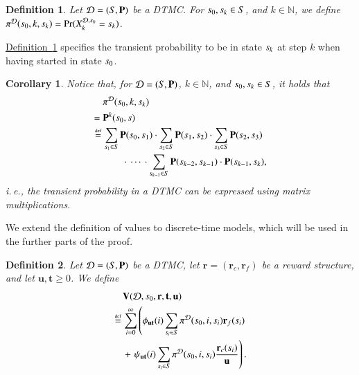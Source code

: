 \documentclass[10pt,twocolumn]{article}
\newtheorem{definition}{Definition}
\newtheorem{corollary}{Corollary}
\DeclareMathOperator{\prob}{Pr}
\newcommand{\states} {{\ensuremath S}}
\newcommand{\state}  {{\ensuremath s}}
\newcommand{\nats}    {{\ensuremath {\mathbb{N}}}}
\newcommand{\pmat}{\mathbf{P}}
\newcommand{\dmodel}{\mathcal{D}}
\newcommand{\urate}{\mathbf{u}}
\newcommand{\rew}{\mathbf{r}}
\newcommand{\frew}{\mathbf{r}_f}
\newcommand{\crew}{\mathbf{r}_c}
\newcommand{\timeb}{\mathbf{t}}
\newcommand{\mvalue}{\mathbf{V}}
\newcommand{\stopro}{X}
\newcommand{\refdef}[1]{\texorpdfstring{\hyperref[def:#1]{Definition~\ref*{def:#1}}}{Definition \ref*{def:#1}}}
\newcommand{\defeq}{\,\stackrel{\mbox{\rm {\tiny def}}}{=}\,}
\newcommand{\tprob}{\pi}
\begin{document}
\begin{definition}
  \label{def:transprobsksp}
Let $\dmodel = (\states, \pmat)$ be a DTMC.
  For $\state_0, \state_k \in \states$, and $k \in \nats$, we define $\tprob^\dmodel(\state_0, k, \state_k) = \prob(\stopro^{\dmodel,\state_0}_k = \state_k)$.
\end{definition}
\refdef{transprobsksp} specifies the transient probability to be in state $\state_k$ at step $k$ when having started in state $\state_0$.
\begin{corollary}
\label{cor:tprob-matrix}
Notice that, for $\dmodel = (\states, \pmat)$, $k \in \nats$, and $\state_0, \state_k \in \states$, it holds that
\begin{equation*}
\begin{split}
& \tprob^\dmodel(\state_0, k, \state_k) \\
= {} & \pmat^k(\state_0, \state) \\
\defeq & \sum_{\state_1 \in \states} \pmat(\state_0, \state_1) \cdot \sum_{\state_2 \in \states} \pmat(\state_1, \state_2) \cdot \sum_{\state_3 \in \states} \pmat(\state_2, \state_3) \\
& \qquad\cdot\,\dotsm\,\cdot \sum_{\state_{k-1}\in\states} \pmat(\state_{k-2}, \state_{k-1}) \cdot \pmat(\state_{k-1}, \state_k),
\end{split}
\end{equation*}
i.\,e., the transient probability in a DTMC can be expressed using matrix multiplications.
\end{corollary}

We extend the definition of values to discrete-time models, which will be used in the further parts of the proof.
\begin{definition}
\label{def:disc-value}
  Let $\dmodel = (\states, \pmat)$ be a DTMC, let $\rew = (\crew, \frew)$ be a reward structure, and let $\urate, \timeb \geq 0$.
  We define
\begin{equation*}
  \begin{split}
    & \mvalue(\dmodel, \state_0, \rew, \timeb, \urate) \\
    \defeq & \sum_{i=0}^\infty \left(\phi_{\urate \timeb}(i) \sum_{\state_i \in \states} \tprob^{\dmodel}(\state_0, i, \state_i) \frew(\state_i)\right. \\
    & + \left.\psi_{\urate \timeb}(i) \sum_{\state_i \in \states} \tprob^{\dmodel}(\state_0, i, \state_i)
  \frac{\crew(\state_i)}{\urate}\right) .
  \end{split}
\end{equation*}
\end{definition}
\end{document}
